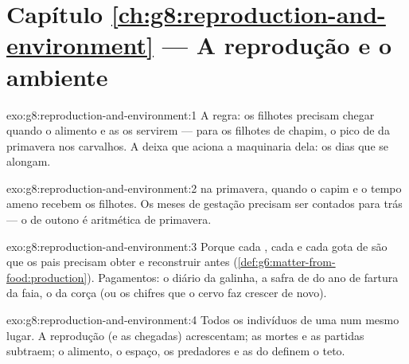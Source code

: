\section*{Capítulo \ref{ch:g8:reproduction-and-environment} --- A reprodução e o ambiente}

\begin{solution}{exo:g8:reproduction-and-environment:1}
A regra: os filhotes precisam chegar quando o alimento e as 
os servirem --- para os filhotes de chapim, o pico de  da
primavera nos carvalhos. A deixa que aciona a maquinaria dela: os dias
que se alongam.
\end{solution}

\begin{solution}{exo:g8:reproduction-and-environment:2}
 na primavera, quando o capim e o tempo ameno recebem os
filhotes. Os meses de gestação precisam ser contados para trás --- o
 de outono é aritmética de primavera.
\end{solution}

\begin{solution}{exo:g8:reproduction-and-environment:3}
Porque cada , cada  e cada gota de  são  que os pais precisam obter e reconstruir antes
(\cref{def:g6:matter-from-food:production}). Pagamentos: o  diário
da galinha, a safra de  do ano de fartura da faia, o  da
corça (ou os chifres que o cervo faz crescer de novo).
\end{solution}

\begin{solution}{exo:g8:reproduction-and-environment:4}
Todos os indivíduos de uma  num mesmo lugar. A reprodução (e as
chegadas) acrescentam; as mortes e as partidas subtraem; o alimento, o
espaço, os predadores e as  do  definem o teto.
\end{solution}

